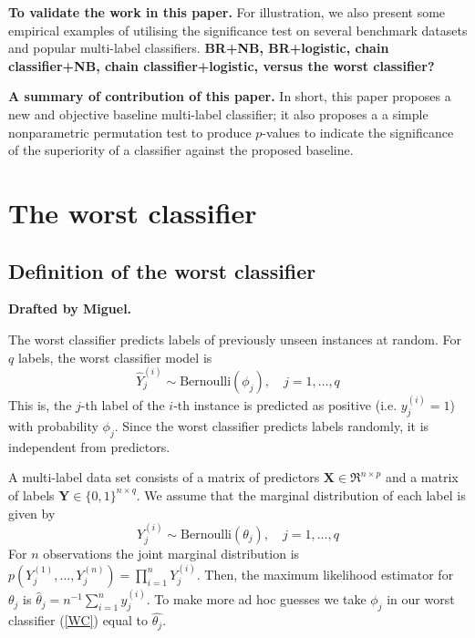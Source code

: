 \documentclass[review]{elsarticle}
\begin{document}
{\bf To validate the work in this paper.}
For illustration, we also present some empirical examples of utilising the significance test on several benchmark datasets and popular multi-label classifiers. {\bf BR+NB, BR+logistic, chain classifier+NB, chain classifier+logistic, versus the worst classifier?}

{\bf A summary of contribution of this paper.}
In short, this paper proposes a new and objective baseline multi-label classifier; it also proposes a a simple nonparametric permutation test to produce $p$-values to indicate the significance of the superiority of a classifier against the proposed baseline.  


\section{The worst classifier}\label{s:worst}

\subsection{Definition of the worst classifier}\label{ss:def}

{\bf Drafted by Miguel.}

The worst classifier predicts labels of previously unseen instances at random. For $q$ labels, the worst classifier model is
\begin{equation}\label{WC}
\hat{Y}^{(i)}_{j} \sim \mathrm{Bernoulli}(\phi_{j}), \quad j = 1,\ldots,q 
\end{equation}
This is, the $j$-th label of the $i$-th instance is predicted as positive (i.e. $y^{(i)}_{j}=1$) with probability $\phi_{j}$. Since the worst classifier predicts labels randomly, it is independent from predictors.

A multi-label data set consists of a matrix of predictors $\mathbf{X} \in \Re^{n \times p}$ and a matrix of labels $\mathbf{Y} \in \{ 0,1 \}^{n \times q}$. We assume that the marginal distribution of each label is given by 
\begin{equation}
Y^{(i)}_{j} \sim \mathrm{Bernoulli}(\theta_{j}), \quad j = 1,\ldots,q 
\end{equation}
For $n$ observations the joint marginal distribution is $p(Y^{(1)}_{j},\ldots,Y^{(n)}_{j}) = \prod^{n}_{i=1}{Y^{(i)}_{j}}$. Then, the maximum likelihood estimator for $\theta_{j}$ is $\hat{\theta}_{j} = n^{-1} \sum^{n}_{i=1}{y^{(i)}_{j}}$. To make more ad hoc guesses we take $\phi_{j}$ in our worst classifier (\ref{WC}) equal to $\hat{\theta_{j}}$.
\end{document}
